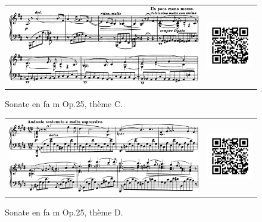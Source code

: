 \begin{figure}[!ht]
  \begin{bigcenter}
    \begin{tabular}{lr}
      \includegraphics[width=12.5cm, keepaspectratio]{sonate-theme-C.png}
      &
      \includegraphics[width=3cm, keepaspectratio]{op1-qr.png}
    \end{tabular}
  \end{bigcenter}
  \caption{\label{sonate-theme-3}Sonate en fa m Op.25, thème C.}
\end{figure}

\begin{figure}[!ht]
  \begin{bigcenter}
    \begin{tabular}{lr}
      \includegraphics[width=12.5cm, keepaspectratio]{sonate-theme-D.png}
      &
      \includegraphics[width=3cm, keepaspectratio]{op1-qr.png}
    \end{tabular}
  \end{bigcenter}
  \caption{\label{sonate-theme-4}Sonate en fa m Op.25, thème D.}
\end{figure}

